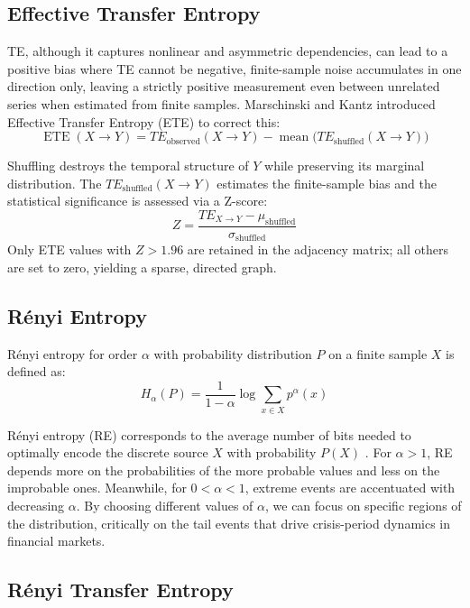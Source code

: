 \documentclass[12pt,oneside]{report}
\DeclareMathOperator{\ETE}{ETE}
\begin{document}
\subsection{Effective Transfer Entropy}

TE, although it captures nonlinear and asymmetric dependencies, can lead
to a positive bias where TE cannot be negative, finite-sample noise
accumulates in one direction only, leaving a strictly positive
measurement even between unrelated series when estimated from finite
samples. Marschinski and Kantz \cite{marschinski2002} introduced
Effective Transfer Entropy (ETE) to correct this:
\[
  \ETE(X \rightarrow Y)
    = TE_{\text{observed}}(X \rightarrow Y)
    - \operatorname{mean}\bigl(TE_{\text{shuffled}}(X \rightarrow Y)\bigr)
\]

Shuffling destroys the temporal structure of $Y$ while preserving its
marginal distribution. The $TE_{\text{shuffled}}(X \rightarrow Y)$
estimates the finite-sample bias and the statistical significance is
assessed via a Z-score:
\[
  Z = \frac{TE_{X \rightarrow Y} - \mu_{\text{shuffled}}}{\sigma_{\text{shuffled}}}
\]
Only ETE values with $Z > 1.96$ are retained in the adjacency matrix;
all others are set to zero, yielding a sparse, directed graph.

\subsection{Rényi Entropy}

Rényi entropy \cite{renyi1961} for order $\alpha$ with probability
distribution $P$ on a finite sample $X$ is defined as:
\[
  H_{\alpha}(P) = \frac{1}{1-\alpha}\log\sum_{x \in X} p^{\alpha}(x)
\]

Rényi entropy (RE) corresponds to the average number of bits needed to
optimally encode the discrete source $X$ with probability $P(X)$
\cite{jizba2022}. For $\alpha > 1$, RE depends more on the probabilities
of the more probable values and less on the improbable ones. Meanwhile,
for $0 < \alpha < 1$, extreme events are accentuated with decreasing
$\alpha$. By choosing different values of $\alpha$, we can focus on
specific regions of the distribution, critically on the tail events that
drive crisis-period dynamics in financial markets.

\subsection{Rényi Transfer Entropy}
\end{document}
